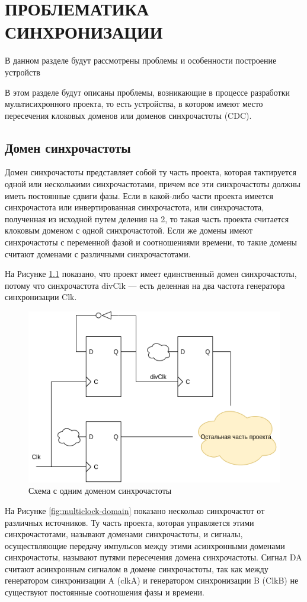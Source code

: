 \newcommand{\erassistant}{ErAssistant~}

\chapter{ПРОБЛЕМАТИКА СИНХРОНИЗАЦИИ}

В данном разделе будут рассмотрены проблемы и особенности построение устройств


В этом разделе будут описаны проблемы, возникающие в процессе разработки мультисихронного проекта, то есть устройства, в котором имеют место пересечения клоковых доменов или доменов синхрочастоты (CDC).

\section{Домен синхрочастоты}
Домен синхрочастоты представляет собой ту часть проекта, которая тактируется одной или несколькими синхрочастотами, причем все эти синхрочастоты должны иметь постоянные сдвиги фазы. Если в какой-либо части проекта имеется синхрочастота или инвертированная синхрочастота, или синхрочастота, полученная из исходной путем деления на 2, то такая часть проекта считается клоковым доменом с одной синхрочастотой. Если же домены имеют синхрочастоты с переменной фазой и соотношениями времени, то такие домены считают доменами с различными синхрочастотами. 

На Рисунке \ref{fig:clock-domain} показано, что проект имеет единственный домен синхрочастоты, потому что синхрочастота divClk --- есть деленная на два частота генератора синхронизации Clk.

\begin{figure}[h!]
	\centering
	\includegraphics[width=0.5\linewidth]{course-scheme/images/clock-domain}
	\caption{Схема с одним доменом синхрочастоты}
	\label{fig:clock-domain}
\end{figure}


На Рисунке \ref{fig:multiclock-domain} показано несколько синхрочастот от различных источников. Ту часть проекта, которая управляется этими синхрочастотами, называют доменами синхрочастоты, и сигналы, осуществляющие передачу импульсов между этими асинхронными доменами синхрочастоты, называют путями пересечения домена синхрочастоты. Сигнал DA считают асинхронным сигналом в домене синхрочастоты, так как между генератором синхронизации A (clkA) и генератором синхронизации B (ClkB) не существуют постоянные соотношения фазы и времени. 




